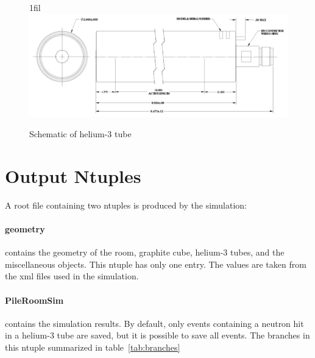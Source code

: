 \documentclass{article}
\makeatletter
\newcommand*{\centerfloat}{%
  \parindent \z@
  \leftskip \z@ \@plus 1fil \@minus \textwidth
  \rightskip\leftskip
  \parfillskip \z@skip}
\makeatother
\begin{document}
\begin{figure}
	\centerfloat
	\includegraphics[width=\columnwidth]{images/GESchematic.pdf}
	\caption{Schematic of helium-3 tube}	
	\label{fig:tubeSchematic}
\end{figure}


\section{Output Ntuples}

	A root file containing two ntuples is produced by the simulation:

	\paragraph{geometry} contains the geometry of the room, graphite cube, helium-3 tubes, and the miscellaneous objects. This ntuple has only one entry. The values are taken from the xml files used in the simulation.

	\paragraph{PileRoomSim} contains the simulation results. By default, only events containing a neutron hit in a helium-3 tube are saved, but it is possible to save all events. The branches in this ntuple summarized in table~\ref{tab:branches}
\end{document}
